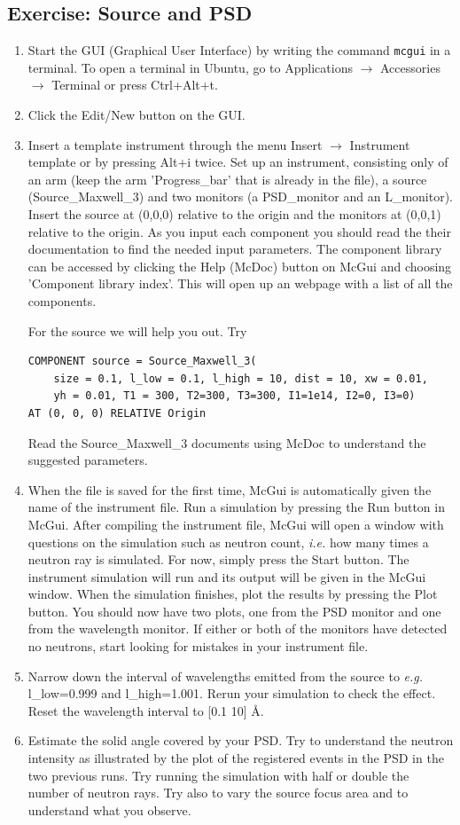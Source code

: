 \subsection{Exercise: Source and PSD}
\begin{enumerate}
\item{Start the GUI (Graphical User Interface) by writing the command \verb+mcgui+ in a terminal. To open a terminal in Ubuntu, go to Applications $\rightarrow$ Accessories $\rightarrow$ Terminal or press Ctrl+Alt+t.}
\item{Click the Edit/New button on the GUI.}
\item{Insert a template instrument through the menu Insert $\rightarrow$ Instrument template or by pressing Alt+i twice. Set up an instrument, consisting only of an arm (keep the arm 'Progress\_bar' that is already in the file), a source (Source\_Maxwell\_3) and two monitors (a PSD\_monitor and an L\_monitor). Insert the source at (0,0,0) relative to the origin and the monitors at (0,0,1) relative to the origin. As you input each component you should read the their documentation to find the needed input parameters. The component library can be accessed by clicking the Help (McDoc) button on McGui and choosing 'Component library index'. This will open up an webpage with a list of all the components.

For the source we will help you out. Try
\begin{verbatim}
COMPONENT source = Source_Maxwell_3(
    size = 0.1, l_low = 0.1, l_high = 10, dist = 10, xw = 0.01,
    yh = 0.01, T1 = 300, T2=300, T3=300, I1=1e14, I2=0, I3=0)
AT (0, 0, 0) RELATIVE Origin
\end{verbatim}
Read the Source\_Maxwell\_3 documents using McDoc to understand the suggested parameters.}
\item{When the file is saved for the first time, McGui is automatically given the name of the instrument file. Run a simulation by pressing the Run button in McGui. After compiling the instrument file, McGui will open a window with questions on the simulation such as neutron count, \emph{i.e.} how many times a neutron ray is simulated. For now, simply press the Start button. The instrument simulation will run and its output will be given in the McGui window. When the simulation finishes, plot the results by pressing the Plot button. You should now have two plots, one from the PSD monitor and one from the wavelength monitor. If either or both of the monitors have detected no neutrons, start looking for mistakes in your instrument file.}
\item{Narrow down the interval of wavelengths emitted from the source to \emph{e.g.} l\_low=0.999 and l\_high=1.001. Rerun your simulation to check the effect. Reset the wavelength interval to [0.1 10] \AA.}
\item{Estimate the solid angle covered by your PSD. Try to understand the neutron intensity as illustrated by the plot of the registered events in the PSD in the two previous runs. Try running the simulation with half or double the number of neutron rays. Try also to vary the source focus area and to understand what you observe.}
\end{enumerate}
